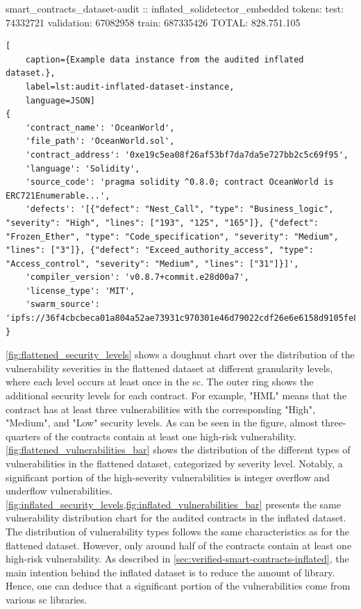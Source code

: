 smart\_contracts\_dataset-audit :: inflated\_solidetector\_embedded tokens:
	test: 74332721
	validation: 67082958
	train: 687335426
TOTAL: 828.751.105


\begin{lstlisting}[
    caption={Example data instance from the audited inflated dataset.},
    label=lst:audit-inflated-dataset-instance,
    language=JSON]
{
    'contract_name': 'OceanWorld',
    'file_path': 'OceanWorld.sol',
    'contract_address': '0xe19c5ea08f26af53bf7da7da5e727bb2c5c69f95',
    'language': 'Solidity',
    'source_code': 'pragma solidity ^0.8.0; contract OceanWorld is ERC721Enumerable...',
    'defects': '[{"defect": "Nest_Call", "type": "Business_logic", "severity": "High", "lines": ["193", "125", "165"]}, {"defect": "Frozen_Ether", "type": "Code_specification", "severity": "Medium", "lines": ["3"]}, {"defect": "Exceed_authority_access", "type": "Access_control", "severity": "Medium", "lines": ["31"]}]',
    'compiler_version': 'v0.8.7+commit.e28d00a7',
    'license_type': 'MIT',
    'swarm_source': 'ipfs://36f4cbcbeca01a804a52ae73931c970301e46d79022cdf26e6e6158d9105fe83'
}
\end{lstlisting}

\cref{fig:flattened_security_levels} shows a doughnut chart over the distribution of the vulnerability severities in the flattened dataset at different granularity levels, where each level occurs at least once in the \acrshort{sc}. The outer ring shows the additional security levels for each contract. For example, "HML" means that the contract has at least three vulnerabilities with the corresponding "High", "Medium", and "Low" security levels. As can be seen in the figure, almost three-quarters of the contracts contain at least one high-risk vulnerability. \cref{fig:flattened_vulnerabilities_bar} shows the distribution of the different types of vulnerabilities in the flattened dataset, categorized by severity level. Notably, a significant portion of the high-severity vulnerabilities is integer overflow and underflow vulnerabilities. \cref{fig:inflated_security_levels,fig:inflated_vulnerabilities_bar} presents the same vulnerability distribution chart for the audited contracts in the inflated dataset. The distribution of vulnerability types follows the same characteristics as for the flattened dataset. However, only around half of the contracts contain at least one high-risk vulnerability. As described in \cref{sec:verified-smart-contracts-inflated}, the main intention behind the inflated dataset is to reduce the amount of library. Hence, one can deduce that a significant portion of the vulnerabilities come from various \acrshort{sc} libraries.

